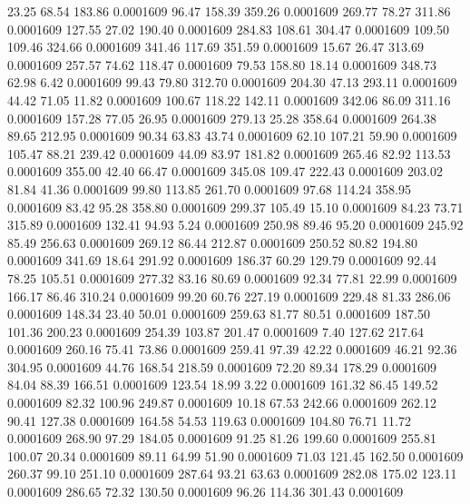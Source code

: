   23.25   68.54  183.86   0.0001609
  96.47  158.39  359.26   0.0001609
 269.77   78.27  311.86   0.0001609
 127.55   27.02  190.40   0.0001609
 284.83  108.61  304.47   0.0001609
 109.50  109.46  324.66   0.0001609
 341.46  117.69  351.59   0.0001609
  15.67   26.47  313.69   0.0001609
 257.57   74.62  118.47   0.0001609
  79.53  158.80   18.14   0.0001609
 348.73   62.98    6.42   0.0001609
  99.43   79.80  312.70   0.0001609
 204.30   47.13  293.11   0.0001609
  44.42   71.05   11.82   0.0001609
 100.67  118.22  142.11   0.0001609
 342.06   86.09  311.16   0.0001609
 157.28   77.05   26.95   0.0001609
 279.13   25.28  358.64   0.0001609
 264.38   89.65  212.95   0.0001609
  90.34   63.83   43.74   0.0001609
  62.10  107.21   59.90   0.0001609
 105.47   88.21  239.42   0.0001609
  44.09   83.97  181.82   0.0001609
 265.46   82.92  113.53   0.0001609
 355.00   42.40   66.47   0.0001609
 345.08  109.47  222.43   0.0001609
 203.02   81.84   41.36   0.0001609
  99.80  113.85  261.70   0.0001609
  97.68  114.24  358.95   0.0001609
  83.42   95.28  358.80   0.0001609
 299.37  105.49   15.10   0.0001609
  84.23   73.71  315.89   0.0001609
 132.41   94.93    5.24   0.0001609
 250.98   89.46   95.20   0.0001609
 245.92   85.49  256.63   0.0001609
 269.12   86.44  212.87   0.0001609
 250.52   80.82  194.80   0.0001609
 341.69   18.64  291.92   0.0001609
 186.37   60.29  129.79   0.0001609
  92.44   78.25  105.51   0.0001609
 277.32   83.16   80.69   0.0001609
  92.34   77.81   22.99   0.0001609
 166.17   86.46  310.24   0.0001609
  99.20   60.76  227.19   0.0001609
 229.48   81.33  286.06   0.0001609
 148.34   23.40   50.01   0.0001609
 259.63   81.77   80.51   0.0001609
 187.50  101.36  200.23   0.0001609
 254.39  103.87  201.47   0.0001609
   7.40  127.62  217.64   0.0001609
 260.16   75.41   73.86   0.0001609
 259.41   97.39   42.22   0.0001609
  46.21   92.36  304.95   0.0001609
  44.76  168.54  218.59   0.0001609
  72.20   89.34  178.29   0.0001609
  84.04   88.39  166.51   0.0001609
 123.54   18.99    3.22   0.0001609
 161.32   86.45  149.52   0.0001609
  82.32  100.96  249.87   0.0001609
  10.18   67.53  242.66   0.0001609
 262.12   90.41  127.38   0.0001609
 164.58   54.53  119.63   0.0001609
 104.80   76.71   11.72   0.0001609
 268.90   97.29  184.05   0.0001609
  91.25   81.26  199.60   0.0001609
 255.81  100.07   20.34   0.0001609
  89.11   64.99   51.90   0.0001609
  71.03  121.45  162.50   0.0001609
 260.37   99.10  251.10   0.0001609
 287.64   93.21   63.63   0.0001609
 282.08  175.02  123.11   0.0001609
 286.65   72.32  130.50   0.0001609
  96.26  114.36  301.43   0.0001609
